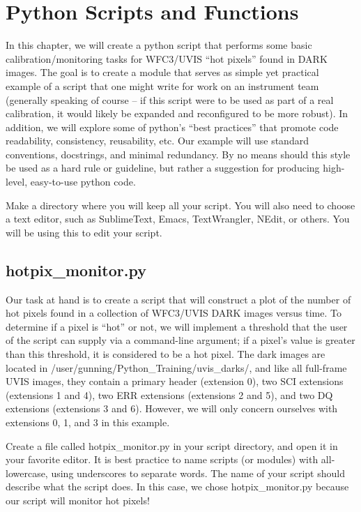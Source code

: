 \chapter{Python Scripts and Functions}
\label{ch:scripts}

In this chapter, we will create a python script that performs some
basic calibration/monitoring tasks for WFC3/UVIS ``hot pixels'' found in
DARK images.  The goal is to create a module that serves as simple yet
practical example of a script that one might write for work on an instrument
team (generally speaking of course -- if this script were to be used as part
of a real calibration, it would likely be expanded and reconfigured to be
more robust).  In addition, we will explore some of python's ``best practices'' that
promote code readability, consistency, reusability, etc.  Our example will use standard 
conventions, docstrings, and minimal redundancy.  By no means should this style be used as
a hard rule or guideline, but rather a suggestion for producing high-level,
easy-to-use python code.

Make a directory where you will keep all your script.  You will also need to 
choose a text editor, such as SublimeText, Emacs, TextWrangler, NEdit,
or others.  You will be using this to edit your script.
 
\section{hotpix\_monitor.py}

Our task at hand is to create a script that will construct a plot of the number 
of hot pixels found in a collection of WFC3/UVIS DARK images versus time. To determine if a pixel 
is ``hot'' or not, we will implement a threshold that the user of the script can 
supply via a command-line argument; if a pixel's value is greater than this threshold, 
it is considered to be a hot pixel.  The dark images are located in 
/user/gunning/Python\_Training/uvis\_darks/, and like all full-frame UVIS images, they contain 
a primary header (extension 0), two SCI extensions (extensions 1 and 4), two ERR extensions
(extensions 2 and 5), and two DQ extensions (extensions 3 and 6).  However, we will only 
concern ourselves with extensions 0, 1, and 3 in this example.

Create a file called {\sf\small hotpix\_monitor.py} in your script directory, and
open it in your favorite editor.  It is best practice to name scripts (or modules) 
with all-lowercase, using underscores to separate words.  The name of your script
should describe what the script does.  In this case, we chose {\sf\small hotpix\_monitor.py}
because our script will monitor hot pixels!

